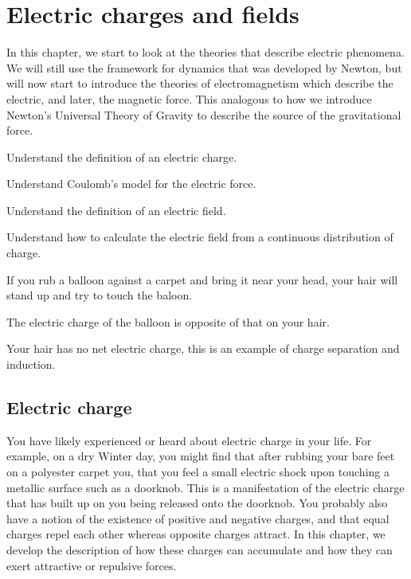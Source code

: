 
\chapter{Electric charges and fields}
\label{chapter:chargesfields}
In this chapter, we start to look at the theories that describe electric phenomena. We will still use the framework for dynamics that was developed by Newton, but will now start to introduce the theories of electromagnetism which describe the electric, and later, the magnetic force. This analogous to how we introduce Newton's Universal Theory of Gravity to describe the source of the gravitational force. 


\begin{learningObjectives}{
 \item Understand the definition of an electric charge.
 \item Understand Coulomb's model for the electric force.
 \item Understand the definition of an electric field.
 \item Understand how to calculate the electric field from a continuous distribution of charge.
 }
\end{learningObjectives}

\begin{opening}
\begin{MCquestion}{If you rub a balloon against a carpet and bring it near your head, your hair will stand up and try to touch the baloon.}
\item The electric charge of the balloon is opposite of that on your hair.
\item Your hair has no net electric charge, this is an example of charge separation and induction. \correct
\end{MCquestion}
\end{opening}

\section{Electric charge}
You have likely experienced or heard about electric charge in your life. For example, on a dry Winter day, you might find that after rubbing your bare feet on a polyester carpet you, that you feel a small electric shock upon touching a metallic surface such as a doorknob. This is a manifestation of the electric charge that has built up on you being released onto the doorknob. You probably also have a notion of the existence of positive and negative charges, and that equal charges repel each other whereas opposite charges attract. In this chapter, we develop the description of how these charges can accumulate and how they can exert attractive or repulsive forces. 

